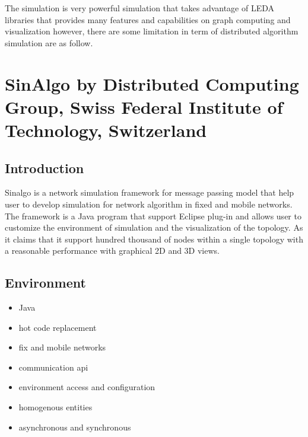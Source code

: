 The simulation is very powerful simulation that takes advantage of LEDA libraries that provides many features and capabilities on graph computing and visualization however, there are some limitation in term of distributed algorithm simulation are as follow.













\section{SinAlgo by Distributed Computing Group, Swiss Federal Institute of Technology, Switzerland}

\subsection*{Introduction}
Sinalgo is a network simulation framework for message passing model that help user to develop simulation for network algorithm in fixed and mobile networks. The framework is a Java program that support Eclipse plug-in and allows user to customize the environment of simulation and the visualization of the topology. As it claims that it support hundred thousand of nodes within a single topology with a reasonable performance with graphical 2D and 3D views.


\subsection*{Environment}
\begin{itemize}
\item Java
\item hot code replacement
\item fix and mobile networks
\item communication api
\item environment access and configuration
\item homogenous entities
\item asynchronous and synchronous
\end{itemize}

